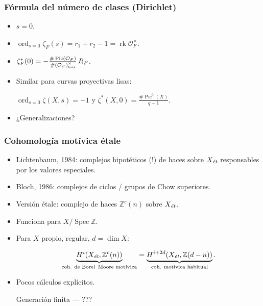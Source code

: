 \documentclass[handout]{beamer}
\newcommand{\FF}{\mathbb{F}}
\newcommand{\ZZ}{\mathbb{Z}}
\DeclareMathOperator{\ord}{ord}
\DeclareMathOperator{\Pic}{Pic}
\DeclareMathOperator{\rk}{rk}
\DeclareMathOperator{\Spec}{Spec}
\newcommand{\et}{\text{\it ét}}
\newcommand{\tors}{\text{\it tors}}
\begin{document}

\begin{frame}
  \frametitle{Fórmula del número de clases (Dirichlet)}

  \begin{itemize}
  \item $s = 0$.

  \item $\ord_{s = 0} \zeta_F (s) = r_1 + r_2 - 1 = \rk \mathcal{O}_F^\times$.

  \item $\zeta_F^* (0) = -\frac{\# \Pic (\mathcal{O}_F)}{\# (\mathcal{O}_F)^\times_\tors}\,R_F$.

  \item Similar para curvas proyectivas lisas:

    $\ord_{s = 0} \zeta (X,s) = -1$ y
    $\zeta^* (X,0) = \frac{\# \Pic^0 (X)}{q-1}$.




  \item ¿Generalizaciones?
  \end{itemize}
\end{frame}


\begin{frame}
  \frametitle{Cohomología motívica étale}

  \begin{itemize}
  \item Lichtenbaum, 1984: complejos hipotéticos (!) de haces sobre $X_\et$
    responsables por los valores especiales.

  \item Bloch, 1986: complejos de ciclos / grupos de Chow superiores.

  \item Versión étale: complejo de haces $\ZZ^c (n)$ sobre $X_\et$.

  \item Funciona para $X / \Spec \ZZ$.

  \item Para $X$ propio, regular, $d = \dim X$:

    \[ \underbrace{H^i (X_\et, \ZZ^c (n))}_{\text{coh. de Borel--Moore motívica}} = \underbrace{H^{i+2d} (X_\et, \ZZ (d-n))}_{\text{coh. motívica habitual}}. \]

  \item Pocos cálculos explícitos.

    Generación finita --- ???
  \end{itemize}
\end{frame}
\end{document}

